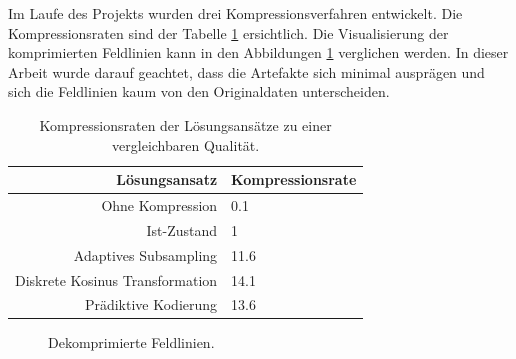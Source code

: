 Im Laufe des Projekts wurden drei Kompressionsverfahren entwickelt. Die Kompressionsraten sind der Tabelle \ref{einleitung:tabelle} ersichtlich. Die Visualisierung der komprimierten Feldlinien kann in den Abbildungen \ref{einleitung:artefakte} verglichen werden. In dieser Arbeit wurde darauf geachtet, dass die Artefakte sich minimal ausprägen und sich die Feldlinien kaum von den Originaldaten unterscheiden.
\begin{table}[!htbp]
	\center
	\begin{tabular}{r|l}
		Lösungsansatz & Kompressionsrate \\\hline
		Ohne Kompression & 0.1\\
		Ist-Zustand & 1\\
		Adaptives Subsampling & 11.6 \\
		Diskrete Kosinus Transformation & 14.1 \\
		Prädiktive Kodierung & 13.6\\
	\end{tabular}
	\caption{Kompressionsraten der Lösungsansätze zu einer vergleichbaren Qualität.}
	\label{einleitung:tabelle}
\end{table}
\begin{figure}[!htbp]
\center
{}
\caption{Dekomprimierte Feldlinien.}
\label{einleitung:artefakte}
\end{figure}